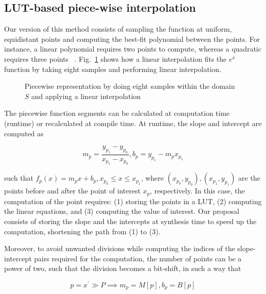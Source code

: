 \documentclass[conference]{IEEEtran}
\begin{document}

\subsection{LUT-based piece-wise interpolation}

Our version of this method consists of sampling the function at uniform, equidistant points and computing the best-fit polynomial between the points. For instance, a linear polynomial requires two points to compute, whereas a quadratic requires three points ~\cite{piecewise}. Fig.~\ref{fig:piecewise} shows how a linear interpolation fits the $e^x$ function by taking eight samples and performing linear interpolation.



\begin{figure}[!t]
    \centering
    \scalebox{0.82}{}
    \caption{Piecewise representation by doing eight samples within the domain $S$ and applying a linear interpolation}
    \label{fig:piecewise}
\end{figure}

The piecewise function segments can be calculated at computation time (runtime) or recalculated at compile time. At runtime, the slope and intercept are computed as 

\begin{equation}
    m_p = \frac{y_{p_1} - y_{p_0}}{x_{p_1} - x_{p_0}}, b_p = y_{p_1} - m_p x_{p_1}
\end{equation}

\noindent such that $f_p(x) = m_p x + b_p, x_{p_0} \le x \le x_{p_1}$, where $(x_{p_0}, y_{p_0}), (x_{p_1}, y_{p_1})$ are the points before and after the point of interest $x_p$, respectively. In this case, the computation of the point requires: (1) storing the points in a LUT, (2) computing the linear equations, and (3) computing the value of interest. Our proposal consists of storing the slope and the intercepts at synthesis time to speed up the computation, shortening the path from (1) to (3).

Moreover, to avoid unwanted divisions while computing the indices of the slope-intercept pairs required for the computation, the number of points can be a power of two, such that the division becomes a bit-shift, in such a way that

\begin{equation}
    p = x^\prime \gg P \implies m_p = M[p], b_p = B[p]
\end{equation}
\end{document}
